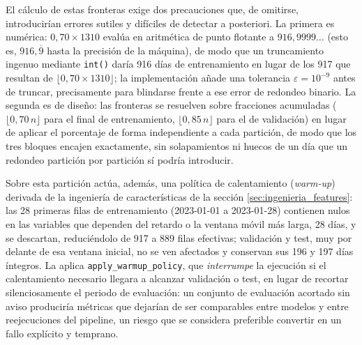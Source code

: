 El cálculo de estas fronteras exige dos precauciones que, de omitirse, introducirían
errores sutiles y difíciles de detectar a posteriori. La primera es numérica: $0{,}70
\times 1310$ evalúa en aritmética de punto flotante a $916{,}9999\ldots$ (esto es,
$916{,}\overline{9}$ hasta la precisión de la máquina), de modo que un truncamiento
ingenuo mediante \texttt{int()} daría 916 días de entrenamiento en lugar de los 917 que
resultan de $\lfloor 0{,}70 \times 1310 \rfloor$; la implementación añade una tolerancia
$\varepsilon = 10^{-9}$ antes de truncar, precisamente para blindarse frente a ese error
de redondeo binario. La segunda es de diseño: las fronteras se resuelven sobre fracciones
acumuladas ($\lfloor 0{,}70 \, n \rfloor$ para el final de entrenamiento, $\lfloor 0{,}85
\, n \rfloor$ para el de validación) en lugar de aplicar el porcentaje de forma
independiente a cada partición, de modo que los tres bloques encajen exactamente, sin
solapamientos ni huecos de un día que un redondeo partición por partición sí podría
introducir.

\begin{table}[htbp]
  \centering
  \small
  
  \caption{}
  \label{tab:particiones}
\end{table}

Sobre esta partición actúa, además, una política de calentamiento (\emph{warm-up})
derivada de la ingeniería de características de la sección \ref{sec:ingenieria_features}:
las 28 primeras filas de entrenamiento (2023-01-01 a 2023-01-28) contienen nulos en las
variables que dependen del retardo o la ventana móvil más larga, 28 días, y se descartan,
reduciéndolo de 917 a 889 filas efectivas; validación y test, muy por delante de esa
ventana inicial, no se ven afectados y conservan sus 196 y 197 días íntegros. La aplica
\texttt{apply\_warmup\_policy}, que \emph{interrumpe} la ejecución si el calentamiento
necesario llegara a alcanzar validación o test, en lugar de recortar silenciosamente el
periodo de evaluación: un conjunto de evaluación acortado sin aviso produciría métricas
que dejarían de ser comparables entre modelos y entre reejecuciones del pipeline, un
riesgo que se considera preferible convertir en un fallo explícito y temprano.

